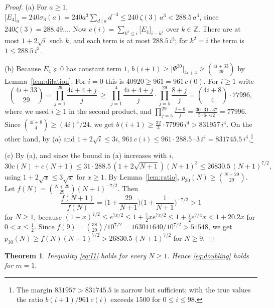 \documentclass[11pt]{amsart}
\newtheorem{theorem}{Theorem}[section]
\theoremstyle{definition}
\newcommand{\ZZ}{\mathbb{Z}}
\newcommand{\coef}[2]{\big[#1\big]_{#2}}
\begin{document}
\begin{proof}
(a) For $a\ge1$, $\coef{E_4}a=240\sigma_3(a)=240a^3\sum_{d\mid a}d^{-3}\le240\,\zeta(3)\,a^3<288.5\,a^3$, since $240\zeta(3)=288.49\ldots$. Now $c(i)=\sum_{k^2\le i}\coef{E_4}{i-k^2}$ over $k\in\ZZ$. There are at most $1+2\sqrt i$ such $k$, and each term is at most $288.5\,i^3$; for $k^2=i$ the term is $1\le288.5\,i^3$.

(b) Because $E_4^\circ\succeq0$ has constant term $1$, $b(i+1)\ge\coef{\Psi^{30}}{4i+4}\ge\binom{4i+33}{29}$ by Lemma~\ref{lem:dilation}. For $i=0$ this is $40920\ge961=961\,c(0)$. For $i\ge1$ write
\[
\binom{4i+33}{29}=\prod_{j=1}^{29}\frac{4i+4+j}j\ \ge\ \prod_{j=1}^{4}\frac{4i+4+j}{j}\cdot\prod_{j=5}^{29}\frac{8+j}j=\binom{4i+8}4\cdot77996,
\]
where we used $i\ge1$ in the second product, and $\prod_{j=5}^{29}\frac{j+8}j=\frac{30\cdot31\cdots37}{5\cdot6\cdots12}=77996$. Since $\binom{4i+8}4\ge(4i)^4/24$, we get $b(i+1)\ge\frac{32}3\cdot77996\,i^4>831957\,i^4$. On the other hand, by (a) and $1+2\sqrt i\le3i$, $961\,c(i)\le961\cdot288.5\cdot3\,i^4=831745.5\,i^4$.\footnote{The margin $831957>831745.5$ is narrow but sufficient; with the true values the ratio $b(i+1)/961\,c(i)$ exceeds $1500$ for $0\le i\le98$.}

(c) By (a), and since the bound in (a) increases with $i$,
\[
30c(N)+c(N+1)\le31\cdot288.5\,(1+2\sqrt{N+1})(N+1)^3\le26830.5\,(N+1)^{7/2},
\]
using $1+2\sqrt x\le3\sqrt x$ for $x\ge1$. By Lemma~\ref{lem:ratio}, $p_{30}(N)\ge\binom{N+29}{29}$. Let $f(N)=\binom{N+29}{29}(N+1)^{-7/2}$. Then
\[
\frac{f(N+1)}{f(N)}=\Big(1+\frac{29}{N+1}\Big)\Big(1+\frac1{N+1}\Big)^{-7/2}>1
\]
for $N\ge1$, because $(1+x)^{7/2}\le e^{7x/2}\le1+\tfrac72xe^{7x/2}\le1+\tfrac72e^{7/4}x<1+20.2x$ for $0<x\le\frac12$. Since $f(9)=\binom{38}{29}/10^{7/2}=163011640/10^{7/2}>51548$, we get $p_{30}(N)\ge f(N)(N+1)^{7/2}>26830.5\,(N+1)^{7/2}$ for $N\ge9$.
\end{proof}

\begin{theorem}\label{thm:I1}
Inequality \eqref{eq:I1} holds for every $N\ge1$. Hence \eqref{eq:doubling} holds for $m=1$.
\end{theorem}
\end{document}

